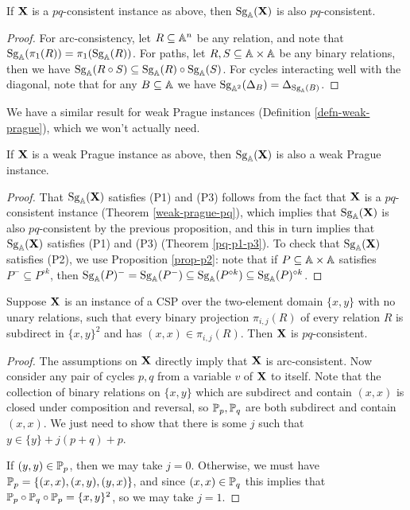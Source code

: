 \documentclass[letterpaper,11pt]{article}
\DeclareMathOperator{\Sg}{Sg}
\begin{document}
\begin{prop}\label{pq-algebraic-closure} If $\mathbf{X}$ is a $pq$-consistent instance as above, then $\Sg_\bA(\fX)$ is also $pq$-consistent.
\end{prop}
\begin{proof} For arc-consistency, let $R \subseteq \mathbb{A}^n$ be any relation, and note that $\Sg_\bA(\pi_1(R)) = \pi_1(\Sg_\bA(R))$. For paths, let $R,S \subseteq \mathbb{A}\times \mathbb{A}$ be any binary relations, then we have $\Sg_\bA(R\circ S) \subseteq \Sg_\bA(R)\circ \Sg_\bA(S)$. For cycles interacting well with the diagonal, note that for any $B \subseteq \mathbb{A}$ we have $\Sg_{\bA^2}(\Delta_B) = \Delta_{\Sg_\bA(B)}$.
\end{proof}

We have a similar result for weak Prague instances (Definition \ref{defn-weak-prague}), which we won't actually need.

\begin{prop} If $\mathbf{X}$ is a weak Prague instance as above, then $\Sg_\bA(\fX)$ is also a weak Prague instance.
\end{prop}
\begin{proof} That $\Sg_\bA(\fX)$ satisfies (P1) and (P3) follows from the fact that $\mathbf{X}$ is a $pq$-consistent instance (Theorem \ref{weak-prague-pq}), which implies that $\Sg_\bA(\fX)$ is also $pq$-consistent by the previous proposition, and this in turn implies that $\Sg_\bA(\fX)$ satisfies (P1) and (P3) (Theorem \ref{pq-p1-p3}). To check that $\Sg_\bA(\fX)$ satisfies (P2), we use Proposition \ref{prop-p2}: note that if $P \subseteq \mathbb{A}\times \mathbb{A}$ satisfies $P^- \subseteq P^{\circ k}$, then $\Sg_\bA(P)^- = \Sg_\bA(P^-) \subseteq \Sg_\bA(P^{\circ k}) \subseteq \Sg_\bA(P)^{\circ k}$.
\end{proof}

\begin{lem} Suppose $\mathbf{X}$ is an instance of a CSP over the two-element domain $\{x,y\}$ with no unary relations, such that every binary projection $\pi_{i,j}(R)$ of every relation $R$ is subdirect in $\{x,y\}^2$ and has $(x,x) \in \pi_{i,j}(R)$. Then $\mathbf{X}$ is $pq$-consistent.
\end{lem}
\begin{proof} The assumptions on $\mathbf{X}$ directly imply that $\mathbf{X}$ is arc-consistent. Now consider any pair of cycles $p,q$ from a variable $v$ of $\mathbf{X}$ to itself. Note that the collection of binary relations on $\{x,y\}$ which are subdirect and contain $(x,x)$ is closed under composition and reversal, so $\mathbb{P}_p,\mathbb{P}_q$ are both subdirect and contain $(x,x)$. We just need to show that there is some $j$ such that $y \in \{y\} + j(p+q) + p$.

If $(y,y) \in \mathbb{P}_p$, then we may take $j = 0$. Otherwise, we must have $\mathbb{P}_p = \{(x,x), (x,y), (y,x)\}$, and since $(x,x) \in \mathbb{P}_q$ this implies that $\mathbb{P}_p \circ \mathbb{P}_q \circ \mathbb{P}_p = \{x,y\}^2$, so we may take $j = 1$. %
\end{proof}
\end{document}
